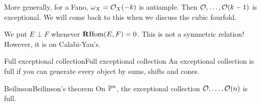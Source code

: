 More generally, for a Fano, $\omega_X=\O_X(-k)$ is antiample. Then $\O,\dots,\O(k-1)$ is exceptional. We will come back to this when we discuss the cubic fourfold.


We put $E \perp F$ whenever $\RHom(E,F)=0$. This is not a symmetric relation! However, it is on Calabi-Yau's.

\begin{definition}{Full exceptional collection}{Full exceptional collection}
    An exceptional collection is full if you can generate every object by sums, shifts and cones.
\end{definition}


\begin{theorem}{Beilinson}{Beilinson's theorem}
    On $\P^n$, the exceptional collection $\O,\dots,\O(n)$ is full.
\end{theorem}

